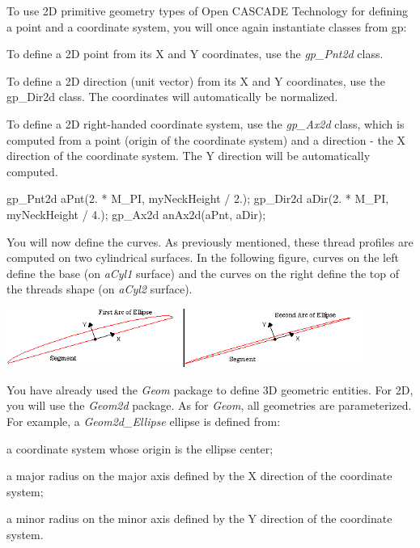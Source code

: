 To use 2D primitive geometry types of Open C\+A\+S\+C\+A\+DE Technology for defining a point and a coordinate system, you will once again instantiate classes from gp\+:


\begin{DoxyItemize}
\item To define a 2D point from its X and Y coordinates, use the {\itshape gp\+\_\+\+Pnt2d} class.
\item To define a 2D direction (unit vector) from its X and Y coordinates, use the gp\+\_\+\+Dir2d class. The coordinates will automatically be normalized.
\item To define a 2D right-\/handed coordinate system, use the {\itshape gp\+\_\+\+Ax2d} class, which is computed from a point (origin of the coordinate system) and a direction -\/ the X direction of the coordinate system. The Y direction will be automatically computed.
\end{DoxyItemize}


\begin{DoxyCode}
gp\_Pnt2d aPnt(2. * M\_PI, myNeckHeight / 2.);
gp\_Dir2d aDir(2. * M\_PI, myNeckHeight / 4.);
gp\_Ax2d anAx2d(aPnt, aDir);
\end{DoxyCode}


You will now define the curves. As previously mentioned, these thread profiles are computed on two cylindrical surfaces. In the following figure, curves on the left define the base (on {\itshape a\+Cyl1} surface) and the curves on the right define the top of the thread\textquotesingle{}s shape (on {\itshape a\+Cyl2} surface).


\begin{DoxyImageNoCaption}
\begin{center}
   \mbox{\includegraphics[width=440]{tutorial_image016.png}}
\end{center}
\end{DoxyImageNoCaption}


You have already used the {\itshape Geom} package to define 3D geometric entities. For 2D, you will use the {\itshape Geom2d} package. As for {\itshape Geom}, all geometries are parameterized. For example, a {\itshape Geom2d\+\_\+\+Ellipse} ellipse is defined from\+:


\begin{DoxyItemize}
\item a coordinate system whose origin is the ellipse center;
\item a major radius on the major axis defined by the X direction of the coordinate system;
\item a minor radius on the minor axis defined by the Y direction of the coordinate system.
\end{DoxyItemize}

